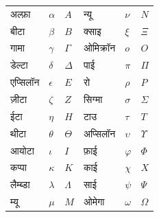 \documentclass[../../../include/open-logic-chapter]{subfiles}
\begin{document}

\begin{center}
    \begin{tabular}{lll@{\qquad}lll}
    अल्फ़ा &	$\alpha$ & $A$ &
    न्यू & $\nu$ & $N$ \\
    बीटा & $\beta$ & $B$ &
    क्साइ & $\xi$ & $\Xi$ \\
    गामा &	$\gamma$ & $\Gamma$ &
    ओमिक्रॉन & $o$ & $O$ \\
    डेल्टा & $\delta$ & $\Delta$ &
    पाई & $\pi$ & $\Pi$ \\
    एप्सिलॉन & $\epsilon$ & $E$ &
    रो & $\rho$ & $P$ \\
    ज़ीटा & $\zeta$ & $Z$ &
    सिग्मा &	$\sigma$ & $\Sigma$ \\
    ईटा & $\eta$ & $H$ &
    टाउ & $\tau$ & $T$ \\
    थीटा & $\theta$ & $\Theta$ &
    अप्सिलॉन & $\upsilon$ & $\Upsilon$ \\
    आयोटा & $\iota$ & $I$ &
    फ़ाई & $\varphi$ & $\Phi$ \\
    कप्पा & $\kappa$ & $K$ &
    काई & $\chi$ & $X$ \\
    लैम्ब्डा & $\lambda$ & $\Lambda$ &
    साई & $\psi$ & $\Psi$ \\
    म्यू & $\mu$ & $M$ &
    ओमेगा & $\omega$ & $\Omega$
    \end{tabular}
\end{center}
\end{document}
